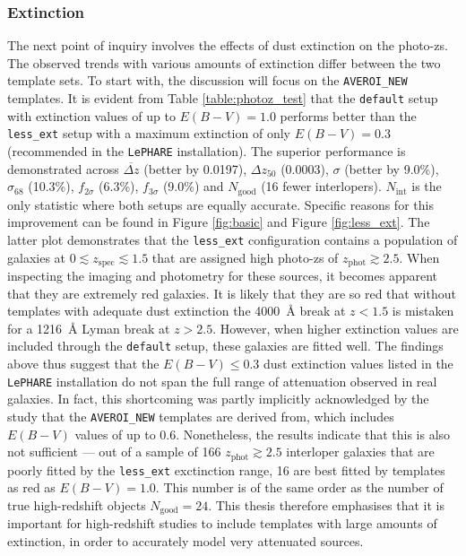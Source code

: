 \subsubsection{Extinction}\label{subsubsection:extinction_discussion}
The next point of inquiry involves the effects of dust extinction on the photo-zs. The observed trends with various amounts of extinction differ between the two template sets. To start with, the discussion will focus on the \texttt{AVEROI\_NEW} templates. It is evident from Table \ref{table:photoz_test} that the \texttt{default} setup with extinction values of up to $E(B-V)=1.0$ performs better than the \texttt{less\_ext} setup with a maximum extinction of only $E(B-V)=0.3$ (recommended in the \texttt{LePHARE} installation). The superior performance is demonstrated across $\overbar{\Delta z}$ (better by 0.0197), $\Delta z_{50}$ (0.0003), $\sigma$ (better by 9.0\%), $\sigma_{68}$ (10.3\%), $f_{2\sigma}$ (6.3\%), $f_{3\sigma}$ (9.0\%) and $N_{\mathrm{good}}$ (16 fewer interlopers). $N_{\mathrm{int}}$ is the only statistic where both setups are equally accurate. Specific reasons for this improvement can be found in Figure \ref{fig:basic} and Figure \ref{fig:less_ext}. The latter plot demonstrates that the \texttt{less\_ext} configuration contains a population of galaxies at $0\lesssim z_{\mathrm{spec}} \lesssim 1.5$ that are assigned high photo-zs of $z_{\mathrm{phot}}\gtrsim 2.5$. When inspecting the imaging and photometry for these sources, it becomes apparent that they are extremely red galaxies. It is likely that they are so red that without templates with adequate dust extinction the \SI{4000}{\angstrom} break at $z<1.5$ is mistaken for a \SI{1216}{\angstrom} Lyman break at $z>2.5$. However, when higher extinction values are included through the \texttt{default} setup, these galaxies are fitted well. The findings above thus suggest that the $E(B-V)\leq0.3$ dust extinction values listed in the \texttt{LePHARE} installation do not span the full range of attenuation observed in real galaxies. In fact, this shortcoming was partly implicitly acknowledged by the \cite{2007A&A...476..137A} study that the \texttt{AVEROI\_NEW} templates are derived from, which includes $E(B-V)$ values of up to 0.6. Nonetheless, the \DESVIDEO results indicate that this is also not sufficient --- out of a sample of 166 $z_{\mathrm{phot}}\gtrsim 2.5$ interloper galaxies that are poorly fitted by the \texttt{less\_ext} exctinction range, 16 are best fitted by templates as red as $E(B-V)=1.0$. This number is of the same order as the number of true high-redshift objects $N_{\mathrm{good}}=24$. This thesis therefore emphasises that it is important for high-redshift studies to include templates with large amounts of extinction, in order to accurately model very attenuated sources.\par 


